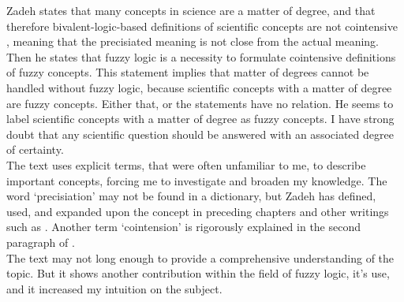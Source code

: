 Zadeh states that many concepts in science are a matter of degree, and that therefore bivalent-logic-based definitions of scientific concepts are not cointensive \cite[2769]{is_there_a_need_for_fuzzy_logic}, meaning that the precisiated meaning is not close from the actual meaning. Then he states that fuzzy logic is a necessity to formulate cointensive definitions of fuzzy concepts. This statement implies that matter of degrees cannot be handled without fuzzy logic, because scientific concepts with a matter of degree are fuzzy concepts. Either that, or the statements have no relation. He seems to label scientific concepts with a matter of degree as fuzzy concepts. I have strong doubt that any scientific question should be answered with an associated degree of certainty. \\

The text uses explicit terms, that were often unfamiliar to me, to describe important concepts, forcing me to investigate and broaden my knowledge. The word `precisiation' may not be found in a dictionary, but Zadeh has defined, used, and expanded upon the concept in preceding chapters and other writings such as \cite{concept_of_cointensive_precisiation}. Another term `cointension' is rigorously explained in the second paragraph of \cite[2760]{is_there_a_need_for_fuzzy_logic}. \\

The text may not long enough to provide a comprehensive understanding of the topic. But it shows another contribution within the field of fuzzy logic, it's use, and it increased my intuition on the subject.
